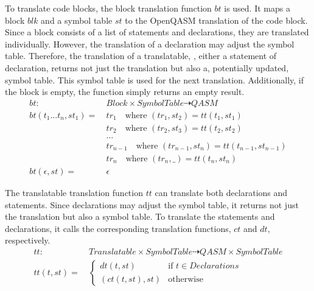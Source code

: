 To translate code blocks, the block translation function $bt$ is used. It maps a block $blk$ and a symbol table $st$ to the OpenQASM translation of the code block. Since a block consists of a list of statements and declarations, they are translated individually. However, the translation of a declaration may adjust the symbol table. Therefore, the translation of a translatable, \ie, either a statement of declaration, returns not just the translation but also a, potentially updated, symbol table. This symbol table is used for the next translation. Additionally, if the block is empty, the function simply returns an empty result.
\begin{align*}
    bt : \ & Block \times SymbolTable \dashrightarrow QASM\\
    bt(t_1 \dots t_n, st_1) = \ &  tr_1 \quad \text{where } (tr_1, st_2) = tt(t_1, st_1)\\
    & tr_2 \quad \text{where } (tr_2, st_3) = tt(t_2, st_2)\\
    & \dots\\
    & tr_{n-1} \quad \text{where } (tr_{n - 1}, st_n) = tt(t_{n - 1}, st_{n - 1})\\
    & tr_n \quad \text{where } (tr_n, \_) = tt(t_n, st_n)\\
    bt(\epsilon, st) = \ &  \epsilon 
\end{align*}

The translatable translation function $tt$ can translate both declarations and statements. Since declarations may adjust the symbol table, it returns not just the translation but also a symbol table. To translate the statements and declarations, it calls the corresponding translation functions, $ct$ and $dt$, respectively.
\begin{align*}
    tt : \ & Translatable \times SymbolTable \dashrightarrow QASM \times SymbolTable\\
    tt(t, st) = \ & \begin{cases}
        dt(t, st)  \quad &\text{if } t \in Declarations\\
        (ct(t, st), st) &\text{otherwise }
    \end{cases}  
\end{align*}

